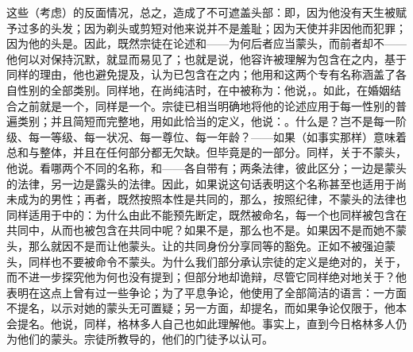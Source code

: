 这些（考虑）的反面情况，总之，造成了不可遮盖头部：即，因为他没有天生被赋予过多的头发；因为剃头或剪短对他来说并不是羞耻；因为天使并非因他而犯罪；因为他的头是。因此，既然宗徒在论述和——为何后者应当蒙头，而前者却不——他何以对保持沉默，就显而易见了；也就是说，他容许被理解为包含在之内，基于同样的理由，他也避免提及，认为已包含在之内；他用和这两个专有名称涵盖了各自性别的全部类别。同样地，在尚纯洁时，在中被称为：他说，。如此，在婚姻结合之前就是一个，同样是一个。宗徒已相当明确地将他的论述应用于每一性别的普遍类别；并且简短而完整地，用如此恰当的定义，他说：。什么是？岂不是每一阶级、每一等级、每一状况、每一尊位、每一年龄？——如果（如事实那样）意味着总和与整体，并且在任何部分都无欠缺。但毕竟是的一部分。同样，关于不蒙头，他说。看哪两个不同的名称，和——各自带有；两条法律，彼此区分；一边是蒙头的法律，另一边是露头的法律。因此，如果说这句话表明这个名称甚至也适用于尚未成为的男性；再者，既然按照本性是共同的，那么，按照纪律，不蒙头的法律也同样适用于中的：为什么由此不能预先断定，既然被命名，每一个也同样被包含在共同中，从而也被包含在共同中呢？如果不是，那么也不是。如果因不是而她不蒙头，那么就因不是而让他蒙头。让的共同身份分享同等的豁免。正如不被强迫蒙头，同样也不要被命令不蒙头。为什么我们部分承认宗徒的定义是绝对的，关于，而不进一步探究他为何也没有提到；但部分地却诡辩，尽管它同样绝对地关于？他表明在这点上曾有过一些争论；为了平息争论，他使用了全部简洁的语言：一方面不提名，以示对她的蒙头无可置疑；另一方面，却提名，而如果争论仅限于，他本会提名。他说，同样，格林多人自己也如此理解他。事实上，直到今日格林多人仍为他们的蒙头。宗徒所教导的，他们的门徒予以认可。\par

